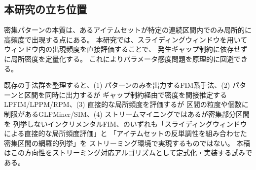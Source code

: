 \subsection{本研究の立ち位置}

密集パターンの本質は、あるアイテムセットが特定の連続区間内でのみ局所的に高頻度で出現する点にある。
本研究では、スライディングウィンドウを用いてウィンドウ内の出現頻度を直接評価することで、
発生ギャップ制約に依存せずに局所密度を定量化する。
これによりパラメータ感度問題を原理的に回避できる。

既存の手法群を整理すると、(1) パターンのみを出力するFIM系手法、(2) パターンと区間を同時に出力するが
ギャップ制約経由で密度を間接推定するLPFIM/LPPM/RPM、(3) 直接的な局所頻度を評価するが
区間の粒度や個数に制限があるGLFMiner/SIM、(4) ストリームマイニングではあるが密集部分区間を
列挙しないインクリメンタルFIM、のいずれも「スライディングウィンドウによる直接的な局所頻度評価」と
「アイテムセットの反単調性を組み合わせた密集区間の網羅的列挙」を
ストリーミング環境で実現するものではない。
本稿はこの方向性をストリーミング対応アルゴリズムとして定式化・実装する試みである。
